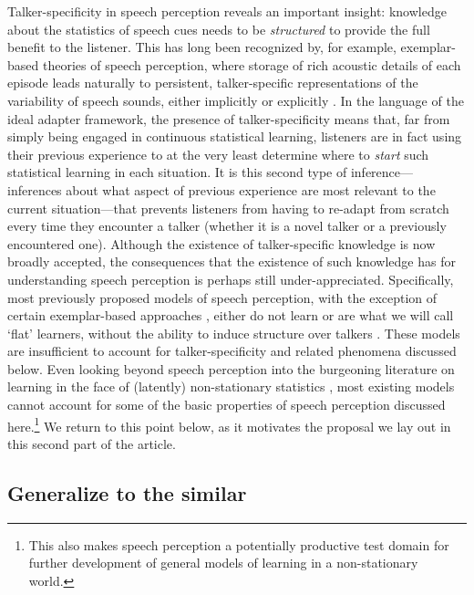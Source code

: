 Talker-specificity in speech perception reveals an important insight: knowledge about the statistics of speech cues needs to be \emph{structured} to provide the full benefit to the listener.  This has long been recognized by, for example, exemplar-based theories of speech perception, where storage of rich acoustic details of each episode leads naturally to persistent, talker-specific representations of the variability of speech sounds, either implicitly or explicitly \autocite{Goldinger1996,Goldinger1998,Johnson1997,Johnson2006,Pierrehumbert2003}.  In the language of the ideal adapter framework, the presence of talker-specificity means that, far from simply being engaged in continuous statistical learning, listeners are in fact using their previous experience to at the very least determine where to \emph{start} such statistical learning in each situation. It is this second type of inference---inferences about what aspect of previous experience are most relevant to the current situation---that prevents listeners from having to re-adapt from scratch every time they encounter a talker (whether it is a novel talker or a previously encountered one). Although the existence of talker-specific knowledge is now broadly accepted, the consequences that the existence of such knowledge has for understanding speech perception is perhaps still under-appreciated. Specifically, most previously proposed models of speech perception, with the exception of certain exemplar-based approaches \autocite{Goldinger1998,Johnson1997,Pierrehumbert2003}, either do not learn \autocite{Clayards2008,Feldman2009a,Norris2008} or are what we will call `flat' learners, without the ability to induce structure over talkers \autocite{Feldman2013a,Lancia2013,McMurray2009,Mirman2006,Vallabha2007}. These models are insufficient to account for talker-specificity and related phenomena discussed below.  Even looking beyond speech perception into the burgeoning literature on learning in the face of (latently) non-stationary statistics \autocite[e.g.,][]{Cho2002,Gallistel2001}, most existing models cannot account for some of the basic properties of speech perception discussed here.\footnote{This also makes speech perception a potentially productive test domain for further development of general models of learning in a non-stationary world.} We return to this point below, as it motivates the proposal we lay out in this second part of the article.

\subsection{Generalize to the similar}
\label{sec:generalize-similar}

